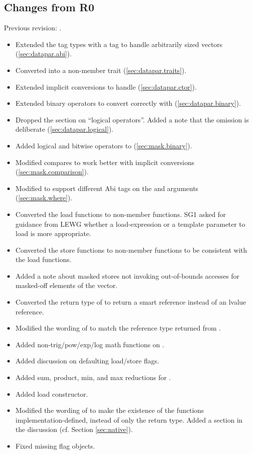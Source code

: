 \subsection{Changes from R0}
Previous revision: \parencite{P0214R0}.
\begin{itemize}
  \item Extended the  tag types with a  tag to handle arbitrarily sized vectors (\ref{sec:datapar.abi}).
  \item Converted  into a non-member trait (\ref{sec:datapar.traits}).
  \item Extended implicit conversions to handle \fixedsizeN (\ref{sec:datapar.ctor}).
  \item Extended binary operators to convert correctly with \fixedsizeN (\ref{sec:datapar.binary}).
  \item Dropped the section on “\datapar logical operators”. Added a note that the omission is deliberate (\ref{sec:datapar.logical}).
  \item Added logical and bitwise operators to \mask (\ref{sec:mask.binary}).
  \item Modified \mask compares to work better with implicit conversions (\ref{sec:mask.comparison}).
  \item Modified  to support different Abi tags on the \mask and \datapar arguments (\ref{sec:mask.where}).
  \item Converted the load functions to non-member functions.
    SG1 asked for guidance from LEWG whether a load-expression or a template parameter to load is more appropriate.
  \item Converted the store functions to non-member functions to be consistent with the load functions.
  \item Added a note about masked stores not invoking out-of-bounds accesses for masked-off elements of the vector.
  \item Converted the return type of \datapar{} to return a smart reference instead of an lvalue reference.
  \item Modified the wording of \mask{} to match the reference type returned from \datapar{}.
  \item Added non-trig/pow/exp/log math functions on \datapar.
  \item Added discussion on defaulting load/store flags.
  \item Added sum, product, min, and max reductions for \datapar.
  \item Added load constructor.
  \item Modified the wording of  to make the existence of the functions implementation-defined, instead of only the return type.
    Added a section in the discussion (cf. Section \ref{sec:native}).
  \item Fixed missing flag objects.
\end{itemize}

